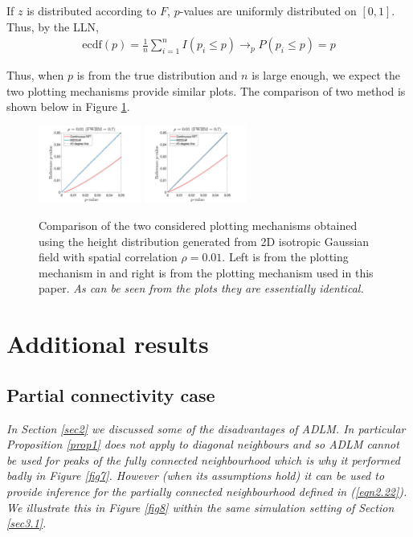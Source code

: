 \documentclass{article}
\newcommand{\nt}[1]{\textit{\color{red} #1}}
\begin{document}
If $z$ is distributed according to $F$, $p$-values are uniformly distributed on $[0,1]$. Thus, by the LLN,
\begin{align*}
    \text{ecdf}(p) = \frac{1}{n}\sum_{i=1}^nI(p_i\leq p)\rightarrow_p P(p_i\leq p) = p
\end{align*}

Thus, when $p$ is from the true distribution and $n$ is large enough, we expect the two plotting mechanisms provide similar plots. The comparison of two method is shown below in Figure \ref{fig18}.

\begin{figure}[!htp]
\centering
\includegraphics[trim=80 5 80 5, clip,width=0.3\textwidth]{figure/Armin_Fabian_method.jpg}
\includegraphics[trim=80 5 80 5, clip,width=0.3\textwidth]{figure/new_method.jpg}
\caption{Comparison of the two considered plotting mechanisms obtained using the height distribution generated from 2D isotropic Gaussian field with spatial correlation $\rho = 0.01$. Left is from the plotting mechanism in \cite{schwartzman2019peak} and right is from the plotting mechanism used in this paper. \nt{As can be seen from the plots they are essentially identical.}\label{fig18}}
\end{figure}

\section{Additional results}
\label{appendix.e}
\subsection{Partial connectivity case}
\label{appendix.d1}
\nt{In Section \ref{sec2} we discussed some of the disadvantages of ADLM. In particular Proposition \ref{prop1} does not apply to diagonal neighbours and so ADLM cannot be used for peaks of the fully connected neighbourhood which is why it performed badly in Figure \ref{fig7}. However (when its assumptions hold) it can be used to provide inference  for the partially connected neighbourhood defined in (\eqref{eqn2.22}). We illustrate this in Figure \ref{fig8} within the same simulation setting of Section \ref{sec3.1}.}
\end{document}
